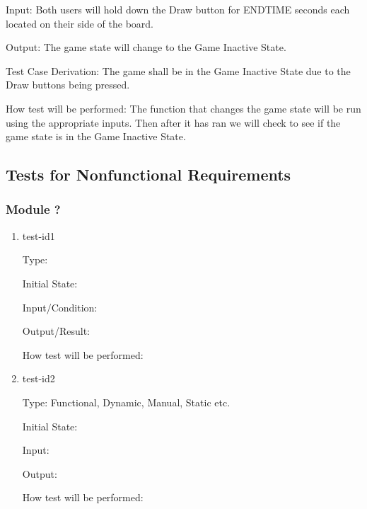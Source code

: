 \documentclass[12pt, titlepage]{article}
\begin{document}
\begin{enumerate}
    Input: Both users will hold down the Draw button for ENDTIME seconds each located on their side of the board.
                        
    Output: The game state will change to the Game Inactive State.
                        
    Test Case Derivation: The game shall be in the Game Inactive State due to the Draw buttons being pressed.
    
    How test will be performed: The function that changes the game state will be run using the appropriate inputs.
    Then after it has ran we will check to see if the game state is in the Game Inactive State.

  \end{enumerate}
   

\subsection{Tests for Nonfunctional Requirements}



\subsubsection{Module ?}
		
\begin{enumerate}

\item{test-id1\\}

Type: 
					
Initial State: 
					
Input/Condition: 
					
Output/Result: 
					
How test will be performed: 
					
\item{test-id2\\}

Type: Functional, Dynamic, Manual, Static etc.
					
Initial State: 
					
Input: 
					
Output: 
					
How test will be performed: 

\end{enumerate}
\end{document}
